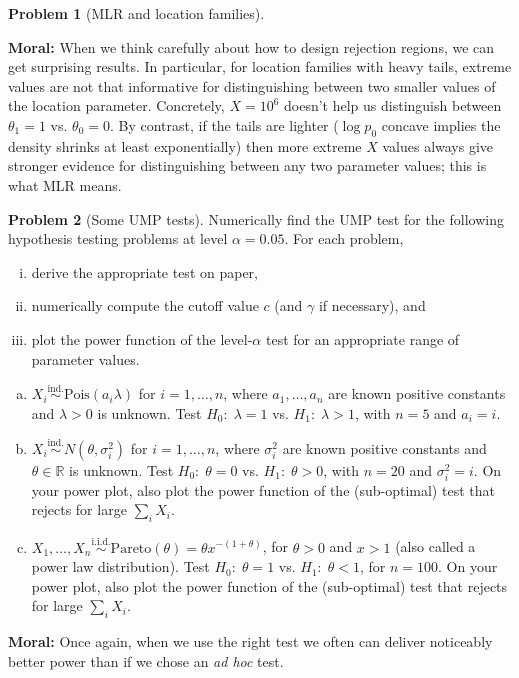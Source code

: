 \documentclass{article}
\newcommand{\RR}{\mathbb{R}}
\newcommand{\simiid}{\overset{\text{i.i.d.}}{\sim}}
\newcommand{\simind}{\overset{\text{ind.}}{\sim}}
\theoremstyle{definition}
\newtheorem{problem}{Problem}
\begin{document}
\begin{problem}[MLR and location families]
\begin{enumerate}[(a)]
\end{enumerate}

{\bf Moral:} When we think carefully about how to design rejection regions, we can get surprising results. In particular, for location families with heavy tails, extreme values are not that informative for distinguishing between two smaller values of the location parameter. Concretely, $X=10^6$ doesn't help us distinguish between $\theta_1=1$ vs. $\theta_0=0$. By contrast, if the tails are lighter ($\log p_0$ concave implies the density shrinks at least exponentially) then more extreme $X$ values always give stronger evidence for distinguishing between any two parameter values; this is what MLR means.
\end{problem}


\begin{problem}[Some UMP tests]

Numerically find the UMP test for the following hypothesis testing problems at level $\alpha=0.05$. For each problem,
\begin{enumerate}[(i)]
\item derive the appropriate test on paper, 
\item numerically compute the cutoff value $c$ (and $\gamma$ if necessary), and 
\item plot the power function of the level-$\alpha$ test for an appropriate range of parameter values.
\end{enumerate}

\begin{enumerate}[(a)]


\item $X_i \simind \text{Pois}(a_i \lambda)$ for $i=1,\ldots,n$, where $a_1,\ldots,a_n$ are known positive constants and $\lambda > 0$ is unknown. Test $H_0:\; \lambda = 1$ vs. $H_1:\; \lambda > 1$, with $n = 5$ and $a_i = i$.




\item $X_i \simind N(\theta, \sigma_i^2)$ for $i=1,\ldots,n$, where $\sigma_i^2$ are known positive constants and $\theta \in \RR$ is unknown. Test $H_0:\; \theta = 0$ vs. $H_1:\; \theta > 0$, with $n = 20$ and $\sigma_i^2 = i$. On your power plot, also plot the power function of the (sub-optimal) test that rejects for large $\sum_i X_i$.





\item $X_1,\ldots, X_n \simiid \text{Pareto}(\theta) = \theta x^{-(1+\theta)}$, for $\theta > 0$ and $x > 1$ (also called a power law distribution). Test $H_0:\; \theta = 1$ vs. $H_1:\; \theta < 1$, for $n = 100$. On your power plot, also plot the power function of the (sub-optimal) test that rejects for large $\sum_i X_i$.




\end{enumerate}

{\bf Moral:} Once again, when we use the right test we often can deliver noticeably better power than if we chose an {\em ad hoc} test.
\end{problem}
\end{document}

